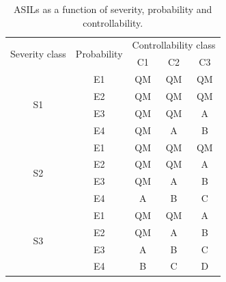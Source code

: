 \begin{table}[h]
\begin{tabular}{|c|c|c|c|c|}
\hline
\multirow{2}{*}{Severity class} &\multirow{2}{*}{Probability} &\multicolumn{3}{|c|}{Controllability class} \\ \cline{3-5}
& &C1 &C2 &C3 \\ \hline
\multirow{4}{*}{S1} & E1 & QM & QM & QM \\ \cline{2-5}
 & E2 & QM & QM & QM \\ \cline{2-5}
 & E3 & QM & QM & A \\ \cline{2-5}
 & E4 & QM & A & B \\ \hline
\multirow{4}{*}{S2} & E1 & QM & QM & QM \\ \cline{2-5}
 & E2 & QM & QM & A \\ \cline{2-5}
 & E3 & QM & A & B \\ \cline{2-5}
 & E4 & A & B & C \\ \hline
\multirow{4}{*}{S3} & E1 & QM & QM & A \\ \cline{2-5}
 & E2 & QM & A & B \\ \cline{2-5}
 & E3 & A & B & C \\ \cline{2-5}
 & E4 & B & C & D \\
\hline
\end{tabular}
\caption{ASILs as a function of severity, probability and controllability.}
\label{table:ASIL}
\end{table}